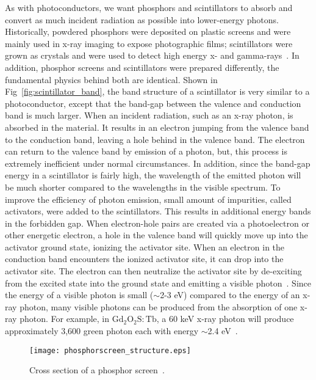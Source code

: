 As with photoconductors, we want phosphors and scintillators to absorb and convert as much incident radiation as possible into lower-energy photons.  Historically, powdered phosphors were deposited on plastic screens and were mainly used in x-ray imaging to expose photographic films; scintillators were grown as crystals and were used to detect high energy x- and gamma-rays~\citep{Nikl2006}.  In addition, phosphor screens and scintillators were prepared differently, the fundamental physics behind both are identical.  Shown in Fig~\ref{fig:scintillator_band}, the band structure of a scintillator is very similar to a photoconductor, except that the band-gap between the valence and conduction band is much larger.  When an incident radiation, such as an x-ray photon, is absorbed in the material.  It results in an electron jumping from the valence band to the conduction band, leaving a hole behind in the valence band.  The electron can return to the valence band by emission of a photon, but, this process is extremely inefficient under normal circumstances.  In addition, since the band-gap energy in a scintillator is fairly high, the wavelength of the emitted photon will be much shorter compared to the wavelengths in the visible spectrum.  To improve the efficiency of photon emission, small amount of impurities, called activators, were added to the scintillators.  This results in additional energy bands in the forbidden gap.  When electron-hole pairs are created via a photoelectron or other energetic electron, a hole in the valence band will quickly move up into the activator ground state, ionizing the activator site.  When an electron in the conduction band encounters the ionized activator site, it can drop into the activator site.  The electron can then neutralize the activator site by de-exciting from the excited state into the ground state and emitting a visible photon~\citep{Knoll2010}.  Since the energy of a visible photon is small ($\sim$2-3 eV) compared to the energy of an x-ray photon, many visible photons can be produced from the absorption of one x-ray photon.  For example, in $\mathrm{Gd_2O_2S:Tb}$, a 60 keV x-ray photon will produce approximately 3,600 green photon each with energy $\sim$2.4 eV~\citep{Rowlands2000}.

\begin{figure}[ht]
\texttt{[image: phosphorscreen\_structure.eps]}
\caption{Cross section of a phosphor screen~\citep{Barrett1981}.}
\label{fig:phosphor_cross_section}
\end{figure}

